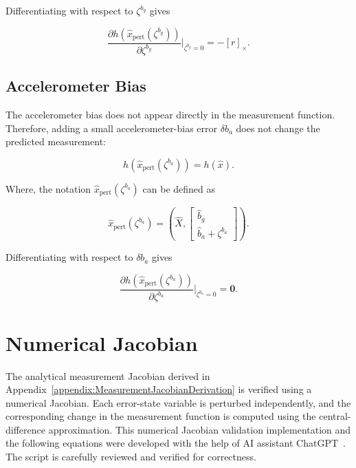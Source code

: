 \documentclass[report.tex]{subfiles}
\begin{document}
    Differentiating with respect to $\zeta^{b_g}$ gives

    \begin{equation}
        \frac{\partial h(\hat x_{\mathrm{pert}}(\zeta^{b_g}))}
        {\partial \zeta^{b_g}}\bigg|_{\zeta^{b_g}=0}
        =
        -[r]_{\times}.
    \end{equation}

    \subsection{Accelerometer Bias}

    The accelerometer bias does not appear directly in the measurement function. Therefore, adding a small accelerometer-bias error $\delta b_a$ does not change the predicted measurement:

    \begin{equation}
       h\left(\hat x_{\mathrm{pert}}(\zeta^{b_a})\right)=h(\hat x).
    \end{equation}

Where, the notation $\hat x_{\mathrm{pert}}(\zeta^{b_a})$ can be defined as 
    
\begin{equation}
    \hat x_{\mathrm{pert}}(\zeta^{b_a})
    =
    \left(
        \hat{X},
        \begin{bmatrix}
            \hat{b}_g \\
            \hat{b}_a +\zeta^{b_a}
        \end{bmatrix}
    \right).
    \label{eq:accBiasPerturbedState}
\end{equation}

    Differentiating with respect to $\delta b_a$ gives

    \begin{equation}
        \frac{\partial h(\hat x_{\mathrm{pert}}(\zeta^{b_a}))}
        {\partial \zeta^{b_a}}\bigg|_{\zeta^{b_a}=0}
        =
        \mathbf{0}.
    \end{equation}

    \section{Numerical Jacobian} \label{appendix:NumericalJacobianCalculation}

    The analytical measurement Jacobian derived in Appendix~\ref{appendix:MeasurementJacobianDerivation} is verified using a numerical Jacobian. Each error-state variable is perturbed independently, and the corresponding change in the measurement function is computed using the central-difference approximation. This numerical Jacobian validation implementation and the following equations were developed with the help of AI assistant ChatGPT~\cite{openai_chatgpt_jacobian_2026}. The script is carefully reviewed and verified for correctness. 
\end{document}
